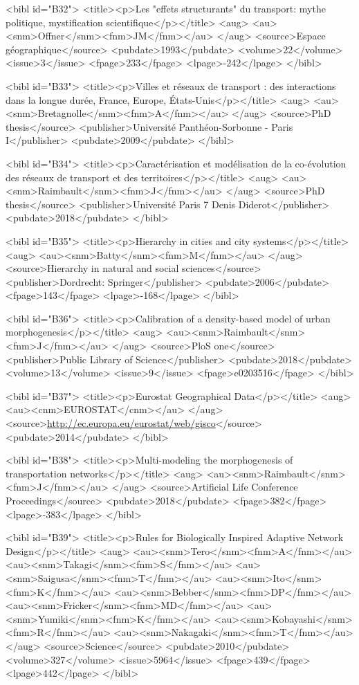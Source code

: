 \documentclass{article}
\begin{document}
{<bibl id="B32">
  <title><p>Les "effets structurants" du transport: mythe politique,
  mystification scientifique</p></title>
  <aug>
    <au><snm>Offner</snm><fnm>JM</fnm></au>
  </aug>
  <source>Espace g{\'e}ographique</source>
  <pubdate>1993</pubdate>
  <volume>22</volume>
  <issue>3</issue>
  <fpage>233</fpage>
  <lpage>-242</lpage>
</bibl>

<bibl id="B33">
  <title><p>{Villes et r{\'e}seaux de transport : des interactions dans la
  longue dur{\'e}e, France, Europe, {\'E}tats-Unis}</p></title>
  <aug>
    <au><snm>Bretagnolle</snm><fnm>A</fnm></au>
  </aug>
  <source>PhD thesis</source>
  <publisher>Universit{\'e} Panth{\'e}on-Sorbonne - Paris I</publisher>
  <pubdate>2009</pubdate>
</bibl>

<bibl id="B34">
  <title><p>Caract{\'e}risation et mod{\'e}lisation de la co-{\'e}volution des
  r{\'e}seaux de transport et des territoires</p></title>
  <aug>
    <au><snm>Raimbault</snm><fnm>J</fnm></au>
  </aug>
  <source>PhD thesis</source>
  <publisher>Universit{\'e} Paris 7 Denis Diderot</publisher>
  <pubdate>2018</pubdate>
</bibl>

<bibl id="B35">
  <title><p>Hierarchy in cities and city systems</p></title>
  <aug>
    <au><snm>Batty</snm><fnm>M</fnm></au>
  </aug>
  <source>Hierarchy in natural and social sciences</source>
  <publisher>Dordrecht: Springer</publisher>
  <pubdate>2006</pubdate>
  <fpage>143</fpage>
  <lpage>-168</lpage>
</bibl>

<bibl id="B36">
  <title><p>Calibration of a density-based model of urban
  morphogenesis</p></title>
  <aug>
    <au><snm>Raimbault</snm><fnm>J</fnm></au>
  </aug>
  <source>PloS one</source>
  <publisher>Public Library of Science</publisher>
  <pubdate>2018</pubdate>
  <volume>13</volume>
  <issue>9</issue>
  <fpage>e0203516</fpage>
</bibl>

<bibl id="B37">
  <title><p>Eurostat Geographical Data</p></title>
  <aug>
    <au><cnm>EUROSTAT</cnm></au>
  </aug>
  <source>\url{http://ec.europa.eu/eurostat/web/gisco}</source>
  <pubdate>2014</pubdate>
</bibl>

<bibl id="B38">
  <title><p>Multi-modeling the morphogenesis of transportation
  networks</p></title>
  <aug>
    <au><snm>Raimbault</snm><fnm>J</fnm></au>
  </aug>
  <source>Artificial Life Conference Proceedings</source>
  <pubdate>2018</pubdate>
  <fpage>382</fpage>
  <lpage>-383</lpage>
</bibl>

<bibl id="B39">
  <title><p>Rules for Biologically Inspired Adaptive Network Design</p></title>
  <aug>
    <au><snm>Tero</snm><fnm>A</fnm></au>
    <au><snm>Takagi</snm><fnm>S</fnm></au>
    <au><snm>Saigusa</snm><fnm>T</fnm></au>
    <au><snm>Ito</snm><fnm>K</fnm></au>
    <au><snm>Bebber</snm><fnm>DP</fnm></au>
    <au><snm>Fricker</snm><fnm>MD</fnm></au>
    <au><snm>Yumiki</snm><fnm>K</fnm></au>
    <au><snm>Kobayashi</snm><fnm>R</fnm></au>
    <au><snm>Nakagaki</snm><fnm>T</fnm></au>
  </aug>
  <source>Science</source>
  <pubdate>2010</pubdate>
  <volume>327</volume>
  <issue>5964</issue>
  <fpage>439</fpage>
  <lpage>442</lpage>
</bibl>

}
\end{document}
